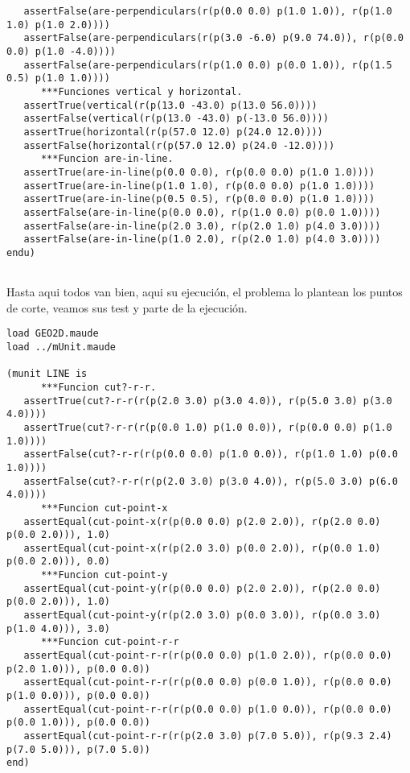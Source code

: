 \documentclass[12pt,a4paper]{book}
\begin{document}
\begin{verbatim}
   assertFalse(are-perpendiculars(r(p(0.0 0.0) p(1.0 1.0)), r(p(1.0 1.0) p(1.0 2.0))))
   assertFalse(are-perpendiculars(r(p(3.0 -6.0) p(9.0 74.0)), r(p(0.0 0.0) p(1.0 -4.0))))
   assertFalse(are-perpendiculars(r(p(1.0 0.0) p(0.0 1.0)), r(p(1.5 0.5) p(1.0 1.0))))
      ***Funciones vertical y horizontal.
   assertTrue(vertical(r(p(13.0 -43.0) p(13.0 56.0))))
   assertFalse(vertical(r(p(13.0 -43.0) p(-13.0 56.0))))
   assertTrue(horizontal(r(p(57.0 12.0) p(24.0 12.0))))
   assertFalse(horizontal(r(p(57.0 12.0) p(24.0 -12.0))))
      ***Funcion are-in-line.
   assertTrue(are-in-line(p(0.0 0.0), r(p(0.0 0.0) p(1.0 1.0))))
   assertTrue(are-in-line(p(1.0 1.0), r(p(0.0 0.0) p(1.0 1.0))))
   assertTrue(are-in-line(p(0.5 0.5), r(p(0.0 0.0) p(1.0 1.0))))
   assertFalse(are-in-line(p(0.0 0.0), r(p(1.0 0.0) p(0.0 1.0))))
   assertFalse(are-in-line(p(2.0 3.0), r(p(2.0 1.0) p(4.0 3.0))))
   assertFalse(are-in-line(p(1.0 2.0), r(p(2.0 1.0) p(4.0 3.0))))
endu)
	
\end{verbatim}

Hasta aqui todos van bien, aqui su ejecuci\'on, el problema lo plantean los puntos de corte, veamos sus test y parte de la ejecuci\'on.

\begin{verbatim}
load GEO2D.maude
load ../mUnit.maude

(munit LINE is
      ***Funcion cut?-r-r.
   assertTrue(cut?-r-r(r(p(2.0 3.0) p(3.0 4.0)), r(p(5.0 3.0) p(3.0 4.0))))
   assertTrue(cut?-r-r(r(p(0.0 1.0) p(1.0 0.0)), r(p(0.0 0.0) p(1.0 1.0))))
   assertFalse(cut?-r-r(r(p(0.0 0.0) p(1.0 0.0)), r(p(1.0 1.0) p(0.0 1.0))))
   assertFalse(cut?-r-r(r(p(2.0 3.0) p(3.0 4.0)), r(p(5.0 3.0) p(6.0 4.0))))
      ***Funcion cut-point-x
   assertEqual(cut-point-x(r(p(0.0 0.0) p(2.0 2.0)), r(p(2.0 0.0) p(0.0 2.0))), 1.0)
   assertEqual(cut-point-x(r(p(2.0 3.0) p(0.0 2.0)), r(p(0.0 1.0) p(0.0 2.0))), 0.0)
      ***Funcion cut-point-y
   assertEqual(cut-point-y(r(p(0.0 0.0) p(2.0 2.0)), r(p(2.0 0.0) p(0.0 2.0))), 1.0)
   assertEqual(cut-point-y(r(p(2.0 3.0) p(0.0 3.0)), r(p(0.0 3.0) p(1.0 4.0))), 3.0)
      ***Funcion cut-point-r-r
   assertEqual(cut-point-r-r(r(p(0.0 0.0) p(1.0 2.0)), r(p(0.0 0.0) p(2.0 1.0))), p(0.0 0.0))
   assertEqual(cut-point-r-r(r(p(0.0 0.0) p(0.0 1.0)), r(p(0.0 0.0) p(1.0 0.0))), p(0.0 0.0))
   assertEqual(cut-point-r-r(r(p(0.0 0.0) p(1.0 0.0)), r(p(0.0 0.0) p(0.0 1.0))), p(0.0 0.0))
   assertEqual(cut-point-r-r(r(p(2.0 3.0) p(7.0 5.0)), r(p(9.3 2.4) p(7.0 5.0))), p(7.0 5.0))
end)
\end{verbatim}
\end{document}
